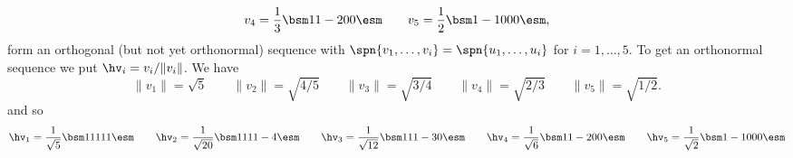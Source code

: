 \begin{solution}
\[    v_4 = \frac{1}{3}\bsm 1\\1\\-2\\0\\0\esm \hspace{2em}
    v_5 = \frac{1}{2}\bsm 1\\-1\\0\\0\\0\esm, 
 \]
 form an orthogonal (but not yet orthonormal) sequence with
 $\spn\{v_1,\dotsc,v_i\}=\spn\{u_1,\dotsc,u_i\}$ for
 $i=1,\dotsc,5$.  To get an orthonormal sequence we put
 $\hv_i=v_i/\|v_i\|$.  We have
 \[ \|v_1\| = \sqrt{5} \hspace{2em}
    \|v_2\| = \sqrt{4/5} \hspace{2em}
    \|v_3\| = \sqrt{3/4} \hspace{2em}
    \|v_4\| = \sqrt{2/3} \hspace{2em}
    \|v_5\| = \sqrt{1/2}.
 \]
 and so 
 \[
  \hv_1 = \frac{1}{\sqrt{5}}\bsm 1\\ 1\\ 1\\ 1\\ 1\esm \hspace{2em}
  \hv_2 = \frac{1}{\sqrt{20}}\bsm 1\\ 1\\ 1\\ 1\\ -4\esm \hspace{2em}
  \hv_3 = \frac{1}{\sqrt{12}}\bsm 1\\ 1\\ 1\\ -3 \\ 0\esm \hspace{2em}
  \hv_4 = \frac{1}{\sqrt{6}}\bsm 1\\ 1\\ -2 \\ 0 \\ 0 \esm \hspace{2em}
  \hv_5 = \frac{1}{\sqrt{2}}\bsm 1\\ -1\\ 0\\ 0\\ 0\esm
 \]
\end{solution}

